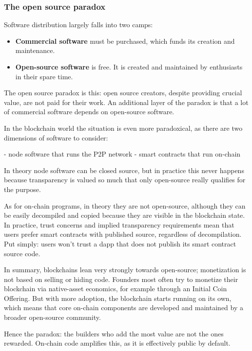 \documentclass[a4paper]{article}
\begin{document}
\subsubsection{The open source paradox}

Software distribution largely falls into two camps:

\begin{itemize}
\item \textbf{Commercial software} must be purchased, which funds its creation and maintenance.
\item \textbf{Open-source software} is free. It is created and maintained by enthusiasts in their spare time.
\end{itemize}

The open source paradox is this: open source creators, despite providing crucial value, are not paid for their work. An additional layer of the paradox is that a lot of commercial software depends on open-source software.

In the blockchain world the situation is even more paradoxical, as there are two dimensions of software to consider:

- node software that runs the P2P network
- smart contracts that run on-chain

In theory node software can be closed source, but in practice this never happens because transparency is valued so much that only open-source really qualifies for the purpose.

As for on-chain programs, in theory they are not open-source, although they can be easily decompiled and copied because they are visible in the blockchain state. In practice, trust concerns and implied transparency requirements mean that users prefer smart contracts with published source, regardless of decompilation. Put simply: users won’t trust a dapp that does not publish its smart contract source code.

In summary, blockchains lean very strongly towards open-source; monetization is not based on selling or hiding code. Founders most often try to monetize their blockchain via native-asset economics, for example through an Initial Coin Offering. But with more adoption, the blockchain starts running on its own, which means that core on-chain components are developed and maintained by a broader open-source community.

Hence the paradox: the builders who add the most value are not the ones rewarded. On-chain code amplifies this, as it is effectively public by default.
\end{document}
